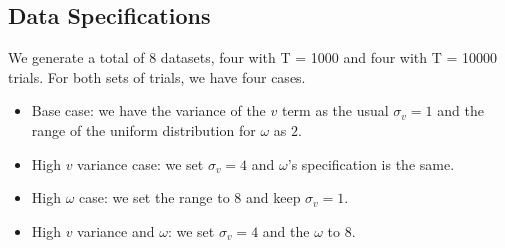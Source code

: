 \documentclass[12pt]{article}
\begin{document}
\subsection{Data Specifications}
We generate a total of 8 datasets, four with T = 1000 and four with T = 10000 trials. For both sets of trials, we have four cases.
\begin{itemize}
    \item Base case: we have the variance of the \(v\) term as the usual \(\sigma_v=1\) and the range of the uniform distribution for \(\omega\) as \(2\).
    \item High \(v\) variance case: we set \(\sigma_v=4\) and \(\omega\)'s specification is the same.
    \item High \(\omega\) case: we set the range to \(8\) and keep \(\sigma_v=1\).
    \item High \(v\) variance and $\omega$: we set \(\sigma_v=4\) and the \(\omega\) to \(8\).
\end{itemize}
\end{document}
